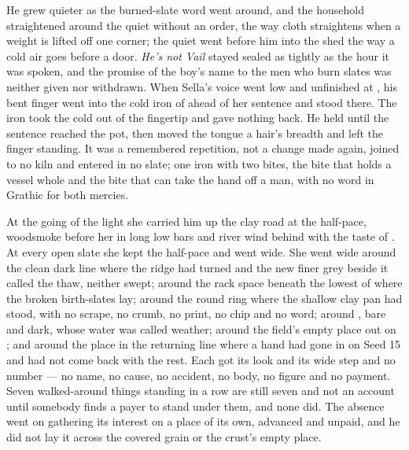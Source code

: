 He grew quieter as the burned-slate word went around, and the household straightened around the quiet without an order, the way cloth straightens when a weight is lifted off one corner; the quiet went before him into the shed the way a cold air goes before a door. \emph{He's not Vail} stayed sealed as tightly as the hour it was spoken, and the promise of the boy's name to the men who burn slates was neither given nor withdrawn. When Sella's voice went low and unfinished at , his bent finger went into the cold iron of  ahead of her sentence and stood there. The iron took the cold out of the fingertip and gave nothing back. He held until the sentence reached the pot, then moved the tongue a hair's breadth and left the finger standing. It was a remembered repetition, not a change made again, joined to no kiln and entered in no slate; one iron with two bites, the bite that holds a vessel whole and the bite that can take the hand off a man, with no word in Grathic for both mercies.

At the going of the light she carried him up the clay road at the half-pace, woodsmoke before her in long low bars and river wind behind with the taste of . At every open slate she kept the half-pace and went wide. She went wide around the clean dark line where the ridge had turned and the new finer grey beside it called the thaw, neither swept; around the rack space beneath the lowest of  where the broken birth-slates lay; around the round ring where the shallow clay pan had stood, with no scrape, no crumb, no print, no chip and no word; around , bare and dark, whose water was called weather; around the field's empty place out on ; and around the place in the returning line where a hand had gone in on Seed 15 and had not come back with the rest. Each got its look and its wide step and no number --- no name, no cause, no accident, no body, no figure and no payment. Seven walked-around things standing in a row are still seven and not an account until somebody finds a payer to stand under them, and none did. The absence went on gathering its interest on a place of its own, advanced and unpaid, and he did not lay it across the covered grain or the crust's empty place.

